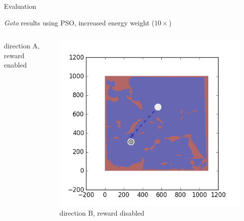 \documentclass[9pt]{beamer}
\begin{document}
\begin{frame}{Evaluation}
\begin{block}{\textit{Goto} results using PSO, increased energy weight ($10\times$)}
\begin{columns}
\begin{column}{0.25\textwidth}
\begin{center}
                    \newline
                    \tiny{direction A, reward enabled}
                \end{center}
            \end{column}
            \begin{column}{0.25\textwidth}
                \begin{center}
                    \includegraphics[width=\textwidth,trim={2cm 2cm 2cm 2cm},clip]{img/EXP3RG_PathAb_-1_-1_0d001_0.png}
                    \newline
                    \tiny{direction B, reward disabled}
                \end{center}
            \end{column}
            \begin{column}{0.25\textwidth}
                \begin{center}

\end{center}
\end{column}
\end{columns}
\end{block}
\end{frame}
\end{document}

